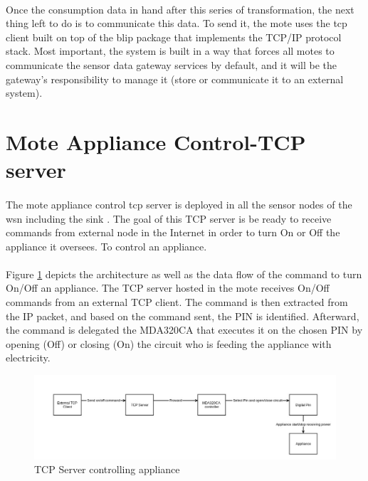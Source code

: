 \documentclass[oneside,12pt,a4paper,final]{book}
\begin{document}
\paragraph{}
Once the consumption data in hand after this series of transformation, the next thing left to do is to communicate this data. To send it, the mote uses the \gls{tcp} client built on top of the \gls{blip} package that implements the TCP/IP protocol stack. Most important, the system is built in a way that forces all motes to communicate the sensor data gateway services by default, and it will be the gateway's responsibility to manage it (store or communicate it to an external system).

\section{ Mote Appliance Control-TCP server}
\paragraph{}
The mote appliance control \gls{tcp} server is deployed in all the sensor nodes of the \gls{wsn} including the sink . The goal of this TCP server is be ready to receive commands from external node in the Internet in order to turn On or Off the appliance it oversees. To control an appliance.
\paragraph{}
Figure \ref{fig:appliance_control} depicts the architecture as well as the data flow of the command to turn On/Off an appliance. The TCP server hosted in the mote receives On/Off commands from an external TCP client. The command is then extracted from the IP packet, and based on the command sent, the PIN is identified. Afterward, the command is delegated the MDA320CA that executes it on the chosen PIN by opening (Off) or closing (On) the circuit who is feeding the appliance with electricity.

\begin{figure}[htbp]
\centering
\includegraphics[scale=0.35]{img/appliance_control.jpg}
\caption{TCP Server controlling appliance}
\label{fig:appliance_control}
\end{figure}
\end{document}
